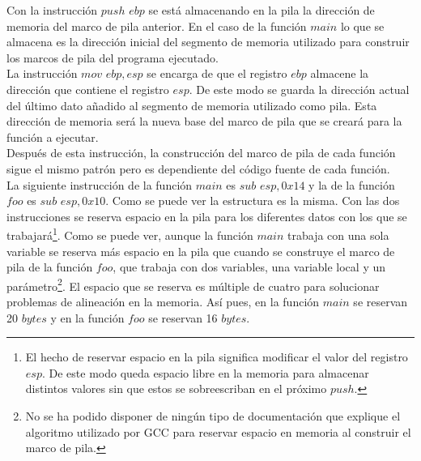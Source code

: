\documentclass [titlepage, 12pt]{article}
\begin{document}
Con la instrucci\'on $push$ $ebp$ se est\'a almacenando en la pila la direcci\'on de memoria del marco de pila anterior. En el caso de la funci\'on $main$ lo que se almacena es la direcci\'on inicial del segmento de memoria utilizado para construir los marcos de pila del programa ejecutado.\\
La instrucci\'on $mov$ $ebp, esp$ se encarga de que el registro $ebp$ almacene la direcci\'on que contiene el registro $esp$. De este modo se guarda la direcci\'on actual del \'ultimo dato a\~nadido al segmento de memoria utilizado como pila. Esta direcci\'on de memoria ser\'a la nueva base del marco de pila que se crear\'a para la funci\'on a ejecutar.\\
Despu\'es de esta instrucci\'on, la construcci\'on del marco de pila de cada funci\'on sigue el mismo patr\'on pero es dependiente del c\'odigo fuente de cada funci\'on. \\
La siguiente instrucci\'on de la funci\'on $main$ es $sub$ $esp, 0x14$ y la de la funci\'on $foo$ es $sub$ $esp, 0x10$. Como se puede ver la estructura es la misma. Con las dos instrucciones se reserva espacio en la pila para los diferentes datos con los que se trabajar\'a\footnote{El hecho de reservar espacio en la pila significa modificar el valor del registro $esp$. De este modo queda espacio libre en la memoria para almacenar distintos valores sin que estos se sobreescriban en el pr\'oximo $push$.}. Como se puede ver, aunque la funci\'on $main$ trabaja con una sola variable se reserva m\'as espacio en la pila que cuando se construye el marco de pila de la funci\'on $foo$, que trabaja con dos variables, una variable local y un par\'ametro\footnote{No se ha podido disponer de ning\'un tipo de documentaci\'on que explique el algoritmo utilizado por GCC para reservar espacio en memoria al construir el marco de pila.}. El espacio que se reserva es m\'ultiple de cuatro para solucionar problemas de alineaci\'on en la memoria. As\'i pues, en la funci\'on $main$ se reservan 20 $bytes$ y en la funci\'on $foo$ se reservan 16 $bytes$.\\
\end{document}
